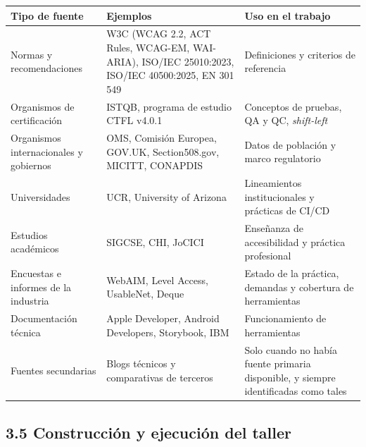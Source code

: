 \documentclass[10pt,letterpaper,onecolumn]{IEEEtran}
\newcommand{\filafina}{\arrayrulecolor{black!30}\specialrule{0.3pt}{1.5pt}{1.5pt}\arrayrulecolor{black}}
\begin{document}
\begin{longtable}[]{@{}
  >{\raggedright\arraybackslash}p{0.2329\dimexpr\linewidth-4\tabcolsep\relax}
  >{\raggedright\arraybackslash}p{0.3836\dimexpr\linewidth-4\tabcolsep\relax}
  >{\raggedright\arraybackslash}p{0.3836\dimexpr\linewidth-4\tabcolsep\relax}@{}}
\toprule\noalign{}
\begin{minipage}[b]{\linewidth}\raggedright
Tipo de fuente
\end{minipage} & \begin{minipage}[b]{\linewidth}\raggedright
Ejemplos
\end{minipage} & \begin{minipage}[b]{\linewidth}\raggedright
Uso en el trabajo
\end{minipage} \\
\midrule\noalign{}
\endhead
\bottomrule\noalign{}
\endlastfoot
Normas y recomendaciones & W3C (WCAG 2.2, ACT Rules, WCAG-EM, WAI-ARIA), ISO/IEC 25010:2023, ISO/IEC 40500:2025, EN 301 549 & Definiciones y criterios de referencia \\ \filafina
Organismos de certificación & ISTQB, programa de estudio CTFL v4.0.1 & Conceptos de pruebas, QA y QC, \emph{shift-left} \\ \filafina
Organismos internacionales y gobiernos & OMS, Comisión Europea, GOV.UK, Section508.gov, MICITT, CONAPDIS & Datos de población y marco regulatorio \\ \filafina
Universidades & UCR, University of Arizona & Lineamientos institucionales y prácticas de CI/CD \\ \filafina
Estudios académicos & SIGCSE, CHI, JoCICI & Enseñanza de accesibilidad y práctica profesional \\ \filafina
Encuestas e informes de la industria & WebAIM, Level Access, UsableNet, Deque & Estado de la práctica, demandas y cobertura de herramientas \\ \filafina
Documentación técnica & Apple Developer, Android Developers, Storybook, IBM & Funcionamiento de herramientas \\ \filafina
Fuentes secundarias & Blogs técnicos y comparativas de terceros & Solo cuando no había fuente primaria disponible, y siempre identificadas como tales \\
\end{longtable}

\subsection{3.5 Construcción y ejecución del taller}\label{construcciuxf3n-y-ejecuciuxf3n-del-taller}
\end{document}
